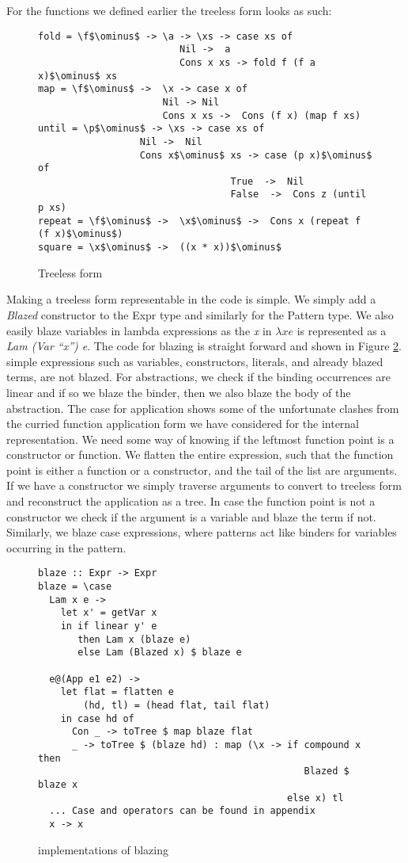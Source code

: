 \documentclass[a4paper, openany]{article}
\begin{document}
For the functions we defined earlier the treeless form looks as such:
\begin{figure}[h!]
\begin{lstlisting}[mathescape=true]
fold = \f$\ominus$ -> \a -> \xs -> case xs of
                         Nil ->  a
                         Cons x xs -> fold f (f a x)$\ominus$ xs
map = \f$\ominus$ ->  \x -> case x of
                      Nil -> Nil
                      Cons x xs ->  Cons (f x) (map f xs)
until = \p$\ominus$ -> \xs -> case xs of
                  Nil ->  Nil
                  Cons x$\ominus$ xs -> case (p x)$\ominus$ of
                                  True  ->  Nil
                                  False  ->  Cons z (until p xs)
repeat = \f$\ominus$ ->  \x$\ominus$ ->  Cons x (repeat f (f x)$\ominus$)
square = \x$\ominus$ ->  ((x * x))$\ominus$
\end{lstlisting}
\caption{Treeless form}
\label{fig:treelessexample}
\end{figure}

Making a treeless form representable in the code is simple. We simply add a \emph{Blazed} constructor to the Expr type and similarly for the Pattern type.
We also easily blaze variables in lambda expressions as the \emph{x} in \(\lambda x e\) is represented as a \emph{Lam (Var ``x'') e}.
The code for blazing is straight forward and shown in Figure \ref{fig:treeless}.
simple expressions such as variables, constructors, literals, and already blazed terms, are not blazed.
For abstractions, we check if the binding occurrences are linear and if so we blaze the binder, then we also blaze the body of the abstraction.
The case for application shows some of the unfortunate clashes from the curried function application form we have considered for the internal representation.
We need some way of knowing if the leftmost function point is a constructor or function. We flatten the entire expression, such that the function point is either a function or a constructor, and the tail of the list are arguments.
If we have a constructor we simply traverse arguments to convert to treeless form and reconstruct the application as a tree. In case the function point is not a constructor we check if the argument is a variable and blaze the term if not.
Similarly, we blaze case expressions, where patterns act like binders for variables occurring in the pattern.

\begin{figure}[h!]
\begin{lstlisting}
blaze :: Expr -> Expr
blaze = \case
  Lam x e ->
    let x' = getVar x
    in if linear y' e
       then Lam x (blaze e)
       else Lam (Blazed x) $ blaze e

  e@(App e1 e2) ->
    let flat = flatten e
        (hd, tl) = (head flat, tail flat)
    in case hd of
      Con _ -> toTree $ map blaze flat
      _ -> toTree $ (blaze hd) : map (\x -> if compound x then
                                               Blazed $ blaze x
                                            else x) tl
  ... Case and operators can be found in appendix
  x -> x
\end{lstlisting}
\caption{implementations of blazing}
\label{fig:treeless}
\end{figure}
\end{document}
